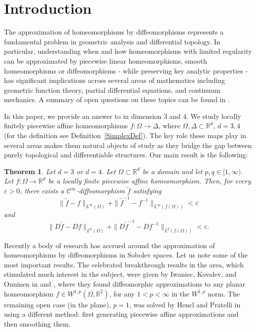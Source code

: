 \documentclass[12pt,a4paper]{amsart}
\theoremstyle{plain}
\newtheorem{thmx}{Theorem}
\theoremstyle{definition}
\numberwithin{equation}{section}
\def\epsilon{\varepsilon}
\def\er{\mathbb R}
\begin{document}
	\section{Introduction}
	
	The approximation of homeomorphisms by diffeomorphisms represents a fundamental problem in geometric analysis and differential topology. In particular, understanding when and how homeomorphisms with limited regularity can be approximated by piecewise linear homeomorphisms, smooth homeomorphisms or diffeomorphisms - while preserving key analytic properties - has significant implications across several areas of mathematics including geometric function theory, partial differential equations, and continuum mechanics. A summary of open questions on these topics can be found in \cite{Hencl}.
	
	In this paper, we provide an answer to \cite[Open Problem 2]{Hencl} in dimension $3$ and $4$. We study locally finitely piecewise affine homeomorphisms $f: \Omega \to \Delta$,  where $\Omega, \Delta \subset \mathbb{R}^d$, $d=3,4$ (for the definition see Definition~\ref{SimplexDef}). The key role these maps play in several areas makes them natural objects of study as they bridge the gap between purely topological and differentiable structures. Our main result is the following:
	
	\begin{thmx}\label{Core}
		Let $d=3$ or $d=4$. Let $\Omega\subset\er^d$ be a domain and let $p,q\in[1,\infty)$. Let $f:\Omega\to\er^d$ be a locally finite piecewise affine homeomorphism. Then, for every $\epsilon>0$, there exists a $\mathcal{C}^{\infty}$-diffeomorphism $\tilde{f}$ satisfying 
		$$
		\|\tilde{f} - f\|_{L^{\infty}(\Omega)}  + \|\tilde{f}^{-1} - f^{-1}\|_{L^{\infty}(f(\Omega))} < \epsilon
		$$
		and
		$$
		\|D\tilde{f} - Df\|_{L^p(\Omega)}  + \|D\tilde{f}^{-1} - Df^{-1}\|_{L^q(f(\Omega))}< \epsilon.
		$$
	\end{thmx}
	
	
	Recently a body of research has accrued around the approximation of homeomorphisms by diffeomorphisms in Sobolev spaces. Let us note some of the most important results. The celebrated breakthrough results in the area, which stimulated much interest in the subject, were given by Iwaniec, Kovalev, and Onninen in \cite{IKO} and \cite{IKO2}, where they found diffeomorphic approximations to any planar homeomorphism $f\in W^{1,p}(\Omega,\mathbb{R}^2)$, for any $1<p<\infty$ in the $W^{1,p}$ norm. The remaining open case (in the plane), $p=1$, was solved by Hencl and Pratelli in \cite{HP} using a different method: first generating piecewise affine approximations and then smoothing them.
	
\end{document}
